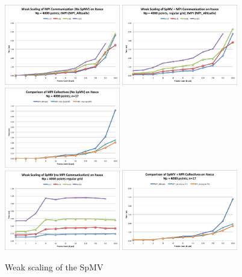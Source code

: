 \documentclass{report}
\begin{document}
\begin{figure}
\centering
\includegraphics[width=0.45\textwidth]{performance_content/scaling/weak_scaling_np4000_regular_alltoallv_commOnly.png}
\includegraphics[width=0.45\textwidth]{performance_content/scaling/weak_scaling_np4000_regular_alltoallv.png}  
\includegraphics[width=0.45\textwidth]{performance_content/scaling/weak_scaling_np4000_regular_n17_compare_commOnly.png} \\
\includegraphics[width=0.45\textwidth]{performance_content/scaling/weak_scaling_np4000_regular_spmvOnly.png} 
\includegraphics[width=0.45\textwidth]{performance_content/scaling/weak_scaling_np4000_regular_n17_compare.png}
\caption{Weak scaling of the SpMV}
\end{figure}
\end{document}
